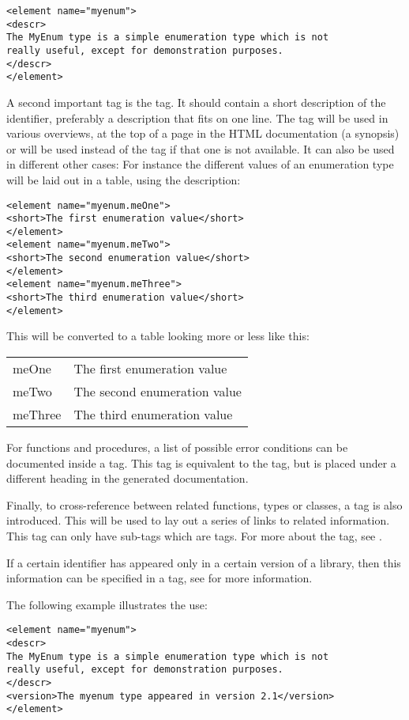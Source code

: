 \begin{verbatim}
<element name="myenum">
<descr>
The MyEnum type is a simple enumeration type which is not
really useful, except for demonstration purposes.
</descr>
</element>
\end{verbatim}

A second important tag is the  tag. It should contain a 
short description of the identifier, preferably a description that fits on
one line. The  tag will be used in
various overviews, at the top of a page in the HTML documentation (a
synopsis) or will be used instead of the  tag if that one 
is not available. It can also be used in different other cases: For 
instance the different values of an enumeration type will be laid 
out in a table, using the  description:
\begin{verbatim}
<element name="myenum.meOne">
<short>The first enumeration value</short>
</element>
<element name="myenum.meTwo">
<short>The second enumeration value</short>
</element>
<element name="myenum.meThree">
<short>The third enumeration value</short>
</element>
\end{verbatim}
This will be converted to a table looking more or less like this:

\begin{tabularx}{\textwidth}{lX}
meOne & The first enumeration value \\
meTwo & The second enumeration value \\
meThree & The third enumeration value \\
\end{tabularx}

For functions and procedures, a list of possible error conditions can be
documented inside a  tag. This tag is equivalent to the
 tag, but is placed under a different heading in the generated
documentation.

Finally, to cross-reference between related functions, types or classes, a
 tag is also introduced. This will be used to lay out a series
of links to related information. This tag can only have sub-tags which are
 tags. For more about the  tag, see .

If a certain identifier has appeared only in a certain version of a library,
then this information can be specified in a  tag, see
 for more information.

The following example illustrates the use:
\begin{verbatim}
<element name="myenum">
<descr>
The MyEnum type is a simple enumeration type which is not
really useful, except for demonstration purposes.
</descr>
<version>The myenum type appeared in version 2.1</version>
</element>
\end{verbatim}

